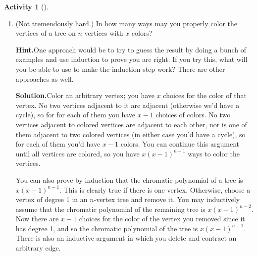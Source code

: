 \documentclass[10pt,]{book}
\theoremstyle{plain}
\theoremstyle{definition}
\newtheorem{activity}[project]{Activity}
\numberwithin{equation}{chapter}
\begin{document}
\begin{activity}[]
\begin{enumerate}[label=(\alph*)]
~\par
\item (Not tremendously hard.) In how many ways may you properly color the vertices of a tree on \(n\) vertices with \(x\) colors?%
\par\medskip\noindent%
\textbf{Hint.}\quad One approach would be to try to guess the result by doing a bunch of examples and use induction to prove you are right. If you try this, what will you be able to use to make the induction step work? There are other approaches as well.%
\par\medskip\noindent%
\textbf{Solution.}\quad Color an arbitrary vertex; you have \(x\) choices for the color of that vertex. No two vertices adjacent to it are adjacent (otherwise we'd have a cycle), so for for each of them you have \(x-1\) choices of colors. No two vertices adjacent to colored vertices are adjacent to each other, nor is one of them adjacent to two colored vertices (in either case you'd have a cycle), so for each of them you'd have \(x-1\) colors. You can continue this argument until all vertices are colored, so you have \(x(x-1)^{n-1}\) ways to color the vertices.%
\par
You can also prove by induction that the chromatic polynomial of a tree is \(x(x-1)^{n-1}\). This is clearly true if there is one vertex. Otherwise, choose a vertex of degree 1 in an \(n\)-vertex tree and remove it. You may inductively assume that the chromatic polynomial of the remaining tree is \(x(x-1)^{n-2}\). Now there are \(x-1\) choices for the color of the vertex you removed since it has degree 1, and so the chromatic polynomial of the tree is \(x(x-1)^{n-1}\). There is also an inductive argument in which you delete and contract an arbitrary edge.%

\end{enumerate}
\end{activity}
\end{document}
